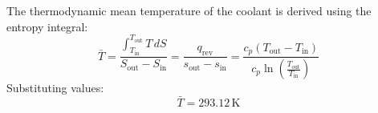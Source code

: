The thermodynamic mean temperature of the coolant is derived using the entropy integral:  
\[
\bar{T} = \frac{\int_{T_{\text{in}}}^{T_{\text{out}}} T \, dS}{S_{\text{out}} - S_{\text{in}}} = \frac{q_{\text{rev}}}{s_{\text{out}} - s_{\text{in}}} = \frac{c_p (T_{\text{out}} - T_{\text{in}})}{c_p \ln \left( \frac{T_{\text{out}}}{T_{\text{in}}} \right)}
\]  
Substituting values:  
\[
\bar{T} = 293.12 \, \text{K}
\]